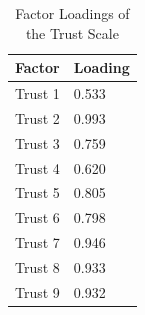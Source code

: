 \documentclass[mnsc]{informs3b} %
\begin{document}
\begin{appendices}
\begin{table}[h]
\centering
\caption{Factor Loadings of the Trust Scale}
\label{tb:factor_loading}
\small
\begin{threeparttable}
\begin{tabular}{L{60pt}C{60pt}}
\toprule
 Factor & Loading \\ \midrule
 Trust 1 & 0.533  \\
 Trust 2 & 0.993  \\
 Trust 3 & 0.759  \\
 Trust 4 &  0.620 \\
 Trust 5 &  0.805 \\
 Trust 6 & 0.798  \\
 Trust 7 &  0.946 \\
 Trust 8 &  0.933 \\
 Trust 9 &  0.932 \\
 \bottomrule
\end{tabular}
\end{threeparttable}
\end{table}

\clearpage




\end{appendices}
\end{document}
